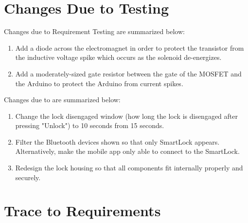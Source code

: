 \documentclass[12pt, titlepage]{article}
\begin{document}
\section{Changes Due to Testing} \label{Changes Due to Testing}


Changes due to Requirement Testing are summarized below:
\begin{enumerate}
    \item Add a diode across the electromagnet in order to protect the transistor from the inductive voltage spike which occurs as the solenoid de-energizes.
    \item Add a moderately-sized gate resistor between the gate of the MOSFET and the Arduino to protect the Arduino from current spikes.
\end{enumerate}

Changes due to  are summarized below:

\begin{enumerate}
    \item Change the lock disengaged window (how long the lock is disengaged after pressing "Unlock") to 10 seconds from 15 seconds.
    \item Filter the Bluetooth devices shown so that only SmartLock appears. Alternatively, make the mobile app only able to connect to the SmartLock.
    \item Redesign the lock housing so that all components fit internally properly and securely. 
 
\end{enumerate}
		
\section{Trace to Requirements}
\end{document}
